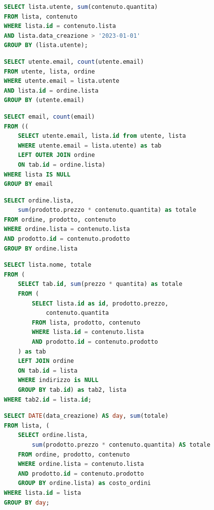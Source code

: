 \documentclass[11pt]{article}
\begin{document}
\begin{lstlisting}[language=SQL]
SELECT lista.utente, sum(contenuto.quantita)
FROM lista, contenuto
WHERE lista.id = contenuto.lista 
AND lista.data_creazione > '2023-01-01'
GROUP BY (lista.utente);
\end{lstlisting}





\begin{lstlisting}[language=SQL]
SELECT utente.email, count(utente.email)
FROM utente, lista, ordine
WHERE utente.email = lista.utente
AND lista.id = ordine.lista
GROUP BY (utente.email)
\end{lstlisting}




\begin{lstlisting}[language=SQL]
SELECT email, count(email) 
FROM ((
	SELECT utente.email, lista.id from utente, lista
	WHERE utente.email = lista.utente) as tab
	LEFT OUTER JOIN ordine
	ON tab.id = ordine.lista)
WHERE lista IS NULL
GROUP BY email
\end{lstlisting}




\begin{lstlisting}[language=SQL]
SELECT ordine.lista, 
	sum(prodotto.prezzo * contenuto.quantita) as totale
FROM ordine, prodotto, contenuto
WHERE ordine.lista = contenuto.lista
AND prodotto.id = contenuto.prodotto
GROUP BY ordine.lista
\end{lstlisting}




\begin{lstlisting}[language=SQL]
SELECT lista.nome, totale 
FROM (
	SELECT tab.id, sum(prezzo * quantita) as totale
	FROM (
		SELECT lista.id as id, prodotto.prezzo, 
			contenuto.quantita
		FROM lista, prodotto, contenuto
		WHERE lista.id = contenuto.lista
		AND prodotto.id = contenuto.prodotto
	) as tab 
	LEFT JOIN ordine
	ON tab.id = lista
	WHERE indirizzo is NULL
	GROUP BY tab.id) as tab2, lista
WHERE tab2.id = lista.id;
\end{lstlisting}




\begin{lstlisting}[language=SQL]
SELECT DATE(data_creazione) AS day, sum(totale)
FROM lista, (
	SELECT ordine.lista, 
		sum(prodotto.prezzo * contenuto.quantita) AS totale
	FROM ordine, prodotto, contenuto
	WHERE ordine.lista = contenuto.lista
	AND prodotto.id = contenuto.prodotto
	GROUP BY ordine.lista) as costo_ordini
WHERE lista.id = lista
GROUP BY day;
\end{lstlisting}
\end{document}
